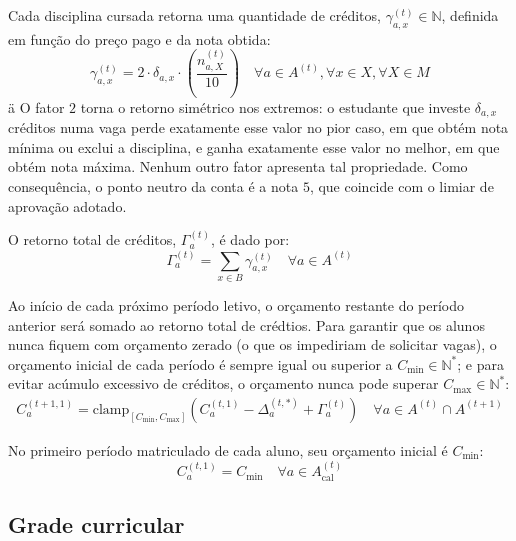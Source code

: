 \documentclass[
    12pt,
    openany,
    oneside,
    a4paper,
    english,
    brazil
]{abntex2}
\begin{document}
Cada disciplina cursada retorna uma quantidade de créditos, $\gamma_{a, x}^{(t)} \in \mathbb{N}$, definida em função do preço pago e da nota obtida:
\begin{equation} \label{eq:retorno}
\gamma_{a, x}^{(t)} = 2 \cdot \delta_{a, x} \cdot (\frac{n_{a, X}^{(t)}}{10})
\quad
\forall a \in A^{(t)}, \forall x \in X, \forall X \in M
\end{equation}
ä
O fator $2$ torna o retorno simétrico nos extremos: o estudante que investe $\delta_{a, x}$ créditos numa vaga perde exatamente esse valor no pior caso, em que obtém nota mínima ou exclui a disciplina, e ganha exatamente esse valor no melhor, em que obtém nota máxima. Nenhum outro fator apresenta tal propriedade. Como consequência, o ponto neutro da conta é a nota $5$, que coincide com o limiar de aprovação adotado.

O retorno total de créditos, $\Gamma_{a}^{(t)}$, é dado por:
\begin{equation}
\Gamma_{a}^{(t)} = \sum_{x \in B} \gamma_{a, x}^{(t)}
\quad
\forall a \in A^{(t)}
\end{equation}

Ao início de cada próximo período letivo, o orçamento restante do período anterior será somado ao retorno total de crédtios. Para garantir que os alunos nunca fiquem com orçamento zerado (o que os impediriam de solicitar vagas), o orçamento inicial de cada período é sempre igual ou superior a $C_{\min} \in \mathbb{N}^*$; e para evitar acúmulo excessivo de créditos, o orçamento nunca pode superar $C_{\max} \in \mathbb{N}^*$:
\begin{equation}\label{creditos_inicio_semestre}
\begin{aligned}
    C_a^{(t + 1, 1)} = \text{clamp}_{[C_{\min}, C_{\max}]} (C_a^{(t, 1)} - \Delta_a^{(t, *)} + \Gamma_a^{(t)})
    \quad \forall a \in A^{(t)} \cap A^{(t + 1)}
\end{aligned}
\end{equation}

No primeiro período matriculado de cada aluno, seu orçamento inicial é $C_{\min}$:
\begin{equation}
C_a^{(t, 1)} = C_{\min}
\quad
\forall a \in A^{(t)}_\text{cal}
\end{equation}


\subsection{Grade curricular}
\label{sec:grade-oferta}
\end{document}

